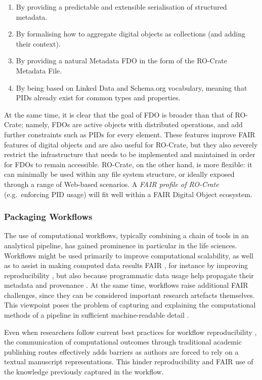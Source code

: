 \begin{enumerate}
\item
  By providing a predictable and extensible serialisation of structured
  metadata.
\item
  By formalising how to aggregate digital objects as collections (and
  adding their context).
\item
  By providing a natural Metadata FDO in the form of the RO-Crate
  Metadata File.
\item
  By being based on Linked Data and Schema.org vocabulary, meaning that
  PIDs already exist for common types and properties.
\end{enumerate}

At the same time, it is clear that the goal of FDO is broader than that
of RO-Crate; namely, FDOs are active objects with distributed
operations, and add further constraints such as PIDs for every element.
These features improve FAIR features of digital objects and are also
useful for RO-Crate, but they also severely restrict the infrastructure
that needs to be implemented and maintained in order for FDOs to remain
accessible. RO-Crate, on the other hand, is more flexible: it can
minimally be used within any file system structure, or ideally exposed
through a range of Web-based scenarios. A \emph{FAIR profile of
RO-Crate} (e.g.~enforcing PID usage) will fit well within a FAIR Digital
Object ecosystem.

\subsubsection{Packaging Workflows}\label{ch5:packaging-workflows}

The use of computational workflows, typically combining a chain of tools
in an analytical pipeline, has gained prominence in particular in the
life sciences. Workflows might be used primarily to improve
computational scalability, as well as to assist in making computed data
results FAIR \cite{Goble 2020}, for
instance by improving reproducibility
\cite{Cohen-Boulakia 2017}, but also
because programmatic data usage help propagate their metadata and
provenance \cite{ch5-69}. At the
same time, workflows raise additional FAIR challenges, since they can be
considered important research artefacts themselves. This viewpoint poses
the problem of capturing and explaining the computational methods of a
pipeline in sufficient machine-readable detail
\cite{Lamprecht 2019}.

Even when researchers follow current best practices for workflow
reproducibility
\cite{Gruning 2018b,Cohen-Boulakia 2017}, the
communication of computational outcomes through traditional academic
publishing routes effectively adds barriers as authors are forced to
rely on a textual manuscript representations. This hinder
reproducibility and FAIR use of the knowledge previously captured in the
workflow.

